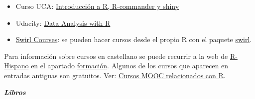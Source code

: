 \documentclass[]{book}
\providecommand{\tightlist}{%
  \setlength{\itemsep}{0pt}\setlength{\parskip}{0pt}}
\begin{document}
\begin{itemize}
\tightlist
\item
  Curso UCA: \href{http://knuth.uca.es/moodle/course/view.php?id=51}{Introducción a R, R-commander y shiny}
\end{itemize}

\begin{itemize}
\tightlist
\item
  Udacity: \href{https://eu.udacity.com/course/data-analysis-with-r--ud651}{Data Analysis with R}
\end{itemize}

\begin{itemize}
\tightlist
\item
  \href{https://swirlstats.com/scn/title.html}{Swirl Courses}:
  se pueden hacer cursos desde el propio R con el paquete
  \href{https://swirlstats.com}{swirl}.
\end{itemize}

Para información sobre cursos en castellano se puede recurrir a la web de \href{http://r-es.org/}{R-Hispano} en el apartado \href{http://r-es.org/category/formacion}{formación}. Algunos de los cursos que aparecen en entradas antiguas son gratuitos.
Ver: \href{http://r-es.org/2016/02/12/cursos-masivos-y-otra-formacion-on-line-sobre-r/}{Cursos MOOC relacionados con R}.

\textbf{\emph{Libros}}
\end{document}

